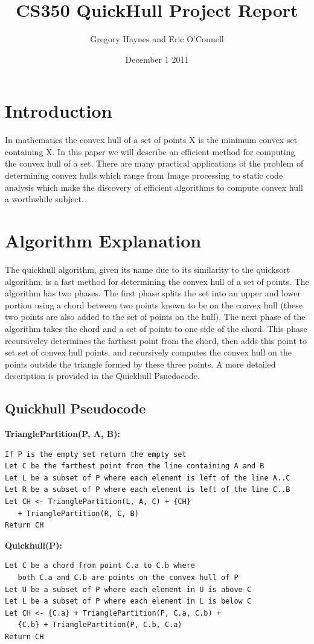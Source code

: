 \documentclass[11pt]{article}
\title{CS350 QuickHull Project Report}
\author{Gregory Haynes and Eric O'Connell}
\date{December 1 2011}
\begin{document}
\maketitle

\section{Introduction}

In mathematics the convex hull of a set of points X is the minimum convex set containing X. In this paper we will describe an efficient method for computing the convex hull of a set. There are many practical applications of the problem of determining convex hulls which range from Image processing to static code analysis which make the discovery of efficient algorithms to compute convex hull a worthwhile subject.

\section{Algorithm Explanation}

The quickhull algorithm, given its name due to its similarity to the quicksort algorithm, is a fast method for determining the convex hull of a set of points. The algorithm has two phases. The first phase splits the set into an upper and lower portion using a chord between two points known to be on the convex hull (these two points are also added to the set of points on the hull). The next phase of the algorithm takes the chord and a set of points to one side of the chord. This phase recursiveley determines the farthest point from the chord, then adds this point to set set of convex hull points, and recursively computes the convex hull on the points outside the triangle formed by these three points. A more detailed description is provided in the Quickhull Psuedocode.

\subsection{Quickhull Pseudocode}

\textbf{TrianglePartition(P, A, B):}
\begin{verbatim}
If P is the empty set return the empty set
Let C be the farthest point from the line containing A and B
Let L be a subset of P where each element is left of the line A..C
Let R be a subset of P where each element is left of the line C..B
Let CH <- TrianglePartition(L, A, C) + {CH}
   + TrianglePartition(R, C, B)
Return CH
\end{verbatim}
\textbf{Quickhull(P):}
\begin{verbatim}
Let C be a chord from point C.a to C.b where 
   both C.a and C.b are points on the convex hull of P
Let U be a subset of P where each element in U is above C
Let L be a subset of P where each element in L is below C
Let CH <- {C.a} + TrianglePartition(P, C.a, C.b) + 
   {C.b} + TrianglePartition(P, C.b, C.a)
Return CH
\end{verbatim}
\end{document}
